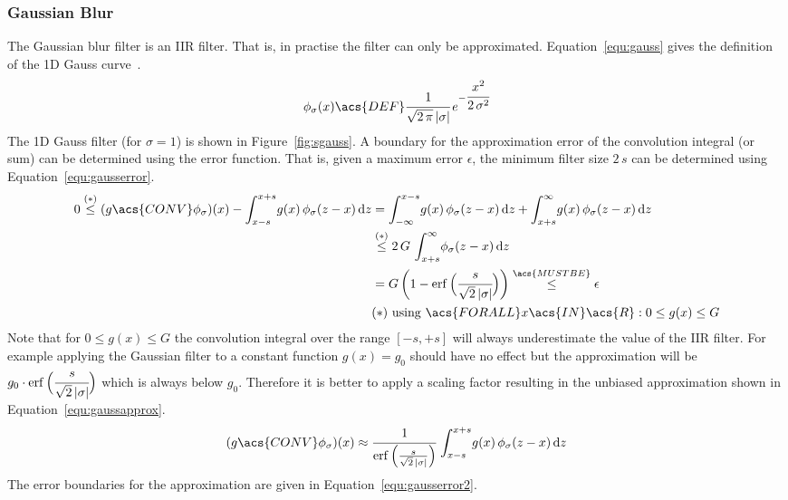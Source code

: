 \documentclass[12pt,a4paper,oneside,openright]{book}
\newcommand{\Eg}{For example }
\newcommand{\Ie}{That is, }
\newcommand{\equ}[1]{Equation~\ref{equ:#1}}
\newcommand{\fig}[1]{Figure~\ref{fig:#1}}
\begin{document}
\begin{CJK}{UTF8}{}
\subsubsection{Gaussian Blur}\label{cha:gauss}
The Gaussian blur filter is an \ac{IIR} filter. \Ie in practise the filter can only be approximated. \equ{gauss} gives the definition of the \acf{1D} Gauss curve~\citep{RefWorks:40}.
\begin{equation}\label{equ:gauss}
  \phi_\sigma(x)\acs{DEF}\cfrac{1}{\sqrt{2\,\pi}\,|\sigma|}\,e^{-\cfrac{x^2}{2\,\sigma^2}}
\end{equation}
The \ac{1D} Gauss filter (for $\sigma=1$) is shown in \fig{sgauss}.
A boundary for the approximation error of the convolution integral (or sum) can be determined using the error function. \Ie given a maximum error $\epsilon$, the minimum filter size $2\,s$ can be determined using \equ{gausserror}.
\begin{align}\label{equ:gausserror}
  \begin{split}
  0\overset{\mathrm{(*)}}{\le}(g\acs{CONV}\phi_\sigma)(x)-\int_{x-s}^{x+s}\! g(x)\,\phi_\sigma(z-x)\,\mathrm{d}z&=\int_{-\infty}^{x-s}\! g(x)\,\phi_\sigma(z-x)\,\mathrm{d}z+\int_{x+s}^{\infty}\! g(x)\,\phi_\sigma(z-x)\,\mathrm{d}z\\
  &\overset{\mathrm{(*)}}{\le} 2\,G\,\int_{x+s}^{\infty}\!\phi_\sigma(z-x)\,\mathrm{d}z\,\\
  &=G\,\bigg(1-\operatorname{erf}\Big(\cfrac{s}{\sqrt{2}\,|\sigma|}\Big)\bigg)\overset{\acs{MUSTBE}}{\le}\epsilon\\
  &\mathrm{(*)\ using\ }\acs{FORALL}x\acs{IN}\acs{R}:0\le g(x)\le G
  \end{split}
\end{align}
Note that for $0\le g(x)\le G$ the convolution integral over the range $[-s,+s]$ will always underestimate the value of the \ac{IIR} filter. \Eg applying the Gaussian filter to a constant function $g(x)=g_0$ should have no effect but the approximation will be $g_0\cdot\operatorname{erf}\Big(\cfrac{s}{\sqrt{2}\,|\sigma|}\Big)$ which is always below $g_0$. Therefore it is better to apply a scaling factor resulting in the unbiased approximation shown in \equ{gaussapprox}.
\begin{equation}\label{equ:gaussapprox}
  (g\acs{CONV}\phi_\sigma)(x)\approx\cfrac{1}{\operatorname{erf}\Big(\frac{s}{\sqrt{2}\,|\sigma|}\Big)}\,\int_{x-s}^{x+s}\! g(x)\,\phi_\sigma(z-x)\,\mathrm{d}z
\end{equation}
The error boundaries for the approximation are given in \equ{gausserror2}.

\end{CJK}
\end{document}
